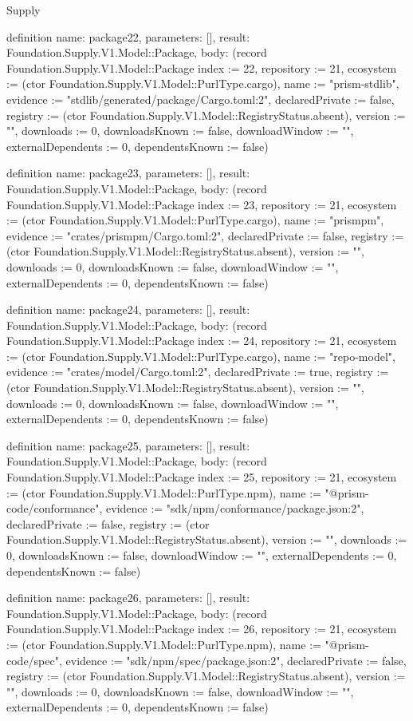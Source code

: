 \begin{lexlean}{Supply}
\begin{semanticmodule}
definition{
  name: package22,
  parameters: [],
  result: Foundation.Supply.V1.Model::Package,
  body: (record Foundation.Supply.V1.Model::Package {index := 22, repository := 21, ecosystem := (ctor Foundation.Supply.V1.Model::PurlType.cargo), name := "prism-stdlib", evidence := "stdlib/generated/package/Cargo.toml:2", declaredPrivate := false, registry := (ctor Foundation.Supply.V1.Model::RegistryStatus.absent), version := "", downloads := 0, downloadsKnown := false, downloadWindow := "", externalDependents := 0, dependentsKnown := false})
}

definition{
  name: package23,
  parameters: [],
  result: Foundation.Supply.V1.Model::Package,
  body: (record Foundation.Supply.V1.Model::Package {index := 23, repository := 21, ecosystem := (ctor Foundation.Supply.V1.Model::PurlType.cargo), name := "prismpm", evidence := "crates/prismpm/Cargo.toml:2", declaredPrivate := false, registry := (ctor Foundation.Supply.V1.Model::RegistryStatus.absent), version := "", downloads := 0, downloadsKnown := false, downloadWindow := "", externalDependents := 0, dependentsKnown := false})
}

definition{
  name: package24,
  parameters: [],
  result: Foundation.Supply.V1.Model::Package,
  body: (record Foundation.Supply.V1.Model::Package {index := 24, repository := 21, ecosystem := (ctor Foundation.Supply.V1.Model::PurlType.cargo), name := "repo-model", evidence := "crates/model/Cargo.toml:2", declaredPrivate := true, registry := (ctor Foundation.Supply.V1.Model::RegistryStatus.absent), version := "", downloads := 0, downloadsKnown := false, downloadWindow := "", externalDependents := 0, dependentsKnown := false})
}

definition{
  name: package25,
  parameters: [],
  result: Foundation.Supply.V1.Model::Package,
  body: (record Foundation.Supply.V1.Model::Package {index := 25, repository := 21, ecosystem := (ctor Foundation.Supply.V1.Model::PurlType.npm), name := "@prism-code/conformance", evidence := "sdk/npm/conformance/package.json:2", declaredPrivate := false, registry := (ctor Foundation.Supply.V1.Model::RegistryStatus.absent), version := "", downloads := 0, downloadsKnown := false, downloadWindow := "", externalDependents := 0, dependentsKnown := false})
}

definition{
  name: package26,
  parameters: [],
  result: Foundation.Supply.V1.Model::Package,
  body: (record Foundation.Supply.V1.Model::Package {index := 26, repository := 21, ecosystem := (ctor Foundation.Supply.V1.Model::PurlType.npm), name := "@prism-code/spec", evidence := "sdk/npm/spec/package.json:2", declaredPrivate := false, registry := (ctor Foundation.Supply.V1.Model::RegistryStatus.absent), version := "", downloads := 0, downloadsKnown := false, downloadWindow := "", externalDependents := 0, dependentsKnown := false})
}


\end{semanticmodule}
\end{lexlean}
